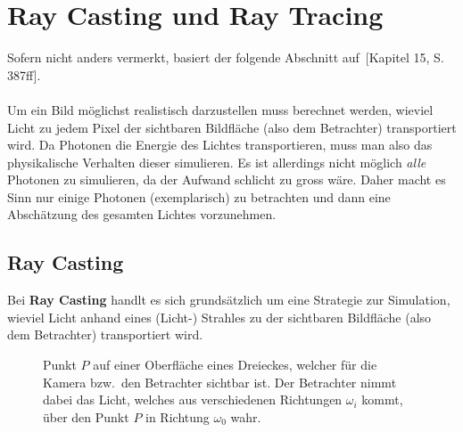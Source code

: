 \section{Ray Casting und Ray Tracing}
\label{sec:ray_casting_tracing}


Sofern nicht anders vermerkt, basiert der folgende Abschnitt
auf~\cite{hughes_computer_2013}[Kapitel 15, S. 387ff].\\
\\
Um ein Bild möglichst realistisch darzustellen muss berechnet werden, wieviel
Licht zu jedem Pixel der sichtbaren Bildfläche (also dem Betrachter)
transportiert wird. Da Photonen die Energie des Lichtes transportieren, muss
man also das physikalische Verhalten dieser simulieren. Es ist allerdings nicht
möglich \textit{alle} Photonen zu simulieren, da der Aufwand schlicht zu gross
wäre. Daher macht es Sinn nur einige Photonen (exemplarisch) zu betrachten und
dann eine Abschätzung des gesamten Lichtes vorzunehmen.\\

\subsection{Ray Casting}
\label{subsec:ray_casting}

Bei \textbf{Ray Casting} handlt es sich grundsätzlich um eine Strategie zur
Simulation, wieviel Licht anhand eines (Licht-) Strahles zu der sichtbaren
Bildfläche (also dem Betrachter) transportiert wird.

\begin{figure}[H]
    \centering {}
    \caption{Punkt $P$ auf einer Oberfläche eines Dreieckes, welcher für die Kamera bzw.\ den Betrachter sichtbar ist.
        Der Betrachter nimmt dabei das Licht, welches aus verschiedenen Richtungen $\omega_{i}$ kommt, über den Punkt $P$ in Richtung $\omega_{0}$ wahr.\label{fig:ray_casting:basics}\protect\footnotemark}
\end{figure}

